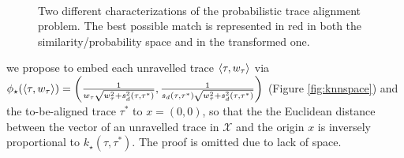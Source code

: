 \begin{figure}[!t]
	\centering
	\qquad
	\\
	\caption{Two different characterizations of the probabilistic trace alignment problem. The best possible match is represented in red in both the similarity/probability space and in the transformed one.}
\end{figure}
 we propose 
 to embed each unravelled trace $\braket{\tau,w_\tau}$ via $\phi_\star(\braket{\tau,w_\tau})=\left(\frac{1}{w_\tau\sqrt{w_\tau^2+s_d^2(\tau,\tau^*)}},\frac{1}{s_d(\tau,\tau^*)\sqrt{w_\tau^2+s_d^2(\tau,\tau^*)}}\right)$ (Figure \ref{fig:knnspace}) and the to-be-aligned trace $\tau^*$ to $x=(0,0)$, so that the the Euclidean distance between the vector of an unravelled trace in $\mathcal{X}$ and the origin $x$ is  inversely proportional to $k_\star(\tau,\tau^*)$. The proof is omitted due to lack of space.
 
